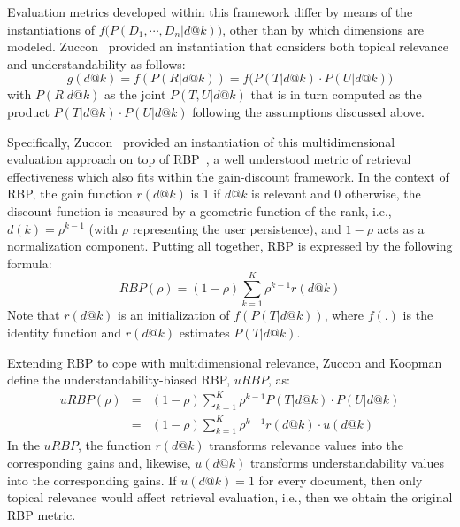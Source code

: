 Evaluation metrics developed within this framework differ by means of the instantiations of $f\big(P(D_1, \cdots, D_n|d@k)\big)$, other than by which dimensions are modeled. Zuccon~\cite{zuccon16} provided an instantiation that considers both topical relevance and understandability as follows:
%
\begin{equation}
g(d@k) = f(P(R|d@k)) = f\big(P(T|d@k) \cdot P(U|d@k)\big)
\end{equation}
%
with $P(R|d@k)$ as the joint $P(T,U|d@k)$ that is in turn computed as the product $P(T|d@k) \cdot P(U|d@k)$ following the assumptions discussed above.

Specifically, Zuccon~\cite{zuccon16} provided an instantiation of this multidimensional evaluation approach on top of RBP~\cite{moffat08}, a well understood metric of retrieval effectiveness which also fits within the gain-discount framework. 
In the context of RBP, the gain function $r(d@k)$ is 1 if $d@k$ is relevant and 0 otherwise, the discount function is measured by a geometric function of the rank, i.e., $d(k) = \rho^{k-1}$ (with $\rho$ representing the user persistence), and $1-\rho$ acts as a normalization component. Putting all together, RBP is expressed by the following formula:
\begin{equation}
    RBP(\rho) = (1-\rho) \sum_{k=1}^{K} \rho^{k-1} r(d@k)
\label{eq:RBP}
\end{equation}
%
Note that $r(d@k)$ is an initialization of $f(P(T|d@k))$, where $f(.)$ is the identity function and $r(d@k)$ estimates $P(T|d@k)$. 

Extending RBP to cope with multidimensional relevance, Zuccon and Koopman~\cite{zuccon14} define the understandability-biased RBP, $uRBP$, as: 
%
\begin{eqnarray}
    uRBP(\rho) &=& (1-\rho) \sum_{k=1}^{K} \rho^{k-1} P(T|d@k) \cdot P(U|d@k)\\ 
&=& (1-\rho) \sum_{k=1}^{K} \rho^{k-1} r(d@k) \cdot u(d@k)
\label{eq:RBP}
\end{eqnarray}
%
In the $uRBP$, the function $r(d@k)$ transforms relevance values into the corresponding gains and, likewise, $u(d@k)$ transforms understandability values into the corresponding gains. 
If $u(d@k)=1$ for every document, then only topical relevance would affect retrieval evaluation, i.e.,  then we obtain the original RBP metric.

